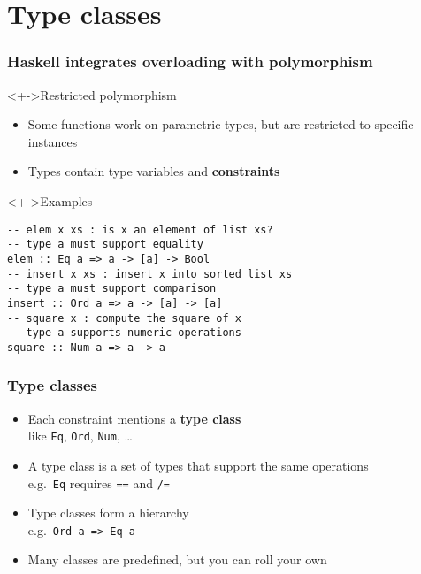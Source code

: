 \documentclass{beamer}
\begin{document}
\section{Type classes}
\begin{frame}[fragile]
  \frametitle{Haskell integrates overloading with polymorphism}
  \begin{block}<+->{Restricted polymorphism}
    \begin{itemize}
    \item Some functions work on parametric types, but are restricted to specific instances
    \item Types contain type variables and \textbf{constraints}
    \end{itemize}
  \end{block}
  \begin{block}<+->{Examples}
\begin{lstlisting}
-- elem x xs : is x an element of list xs?
-- type a must support equality
elem :: Eq a => a -> [a] -> Bool
-- insert x xs : insert x into sorted list xs
-- type a must support comparison
insert :: Ord a => a -> [a] -> [a]
-- square x : compute the square of x
-- type a supports numeric operations
square :: Num a => a -> a
\end{lstlisting}
  \end{block}
\end{frame}
\begin{frame}[fragile]
  \frametitle{Type classes}
  \begin{itemize}
  \item Each constraint mentions a \textbf{type class}\\
    like \texttt{Eq}, \texttt{Ord}, \texttt{Num}, \dots
  \item A type class is a set of types that support the same operations\\
    e.g.\ \texttt{Eq} requires \texttt{==} and \texttt{/=}
  \item Type classes form a hierarchy\\
    e.g.\ \texttt{Ord a => Eq a}
  \item Many classes are predefined, but you can roll your own
  \end{itemize}
\end{frame}
\end{document}
